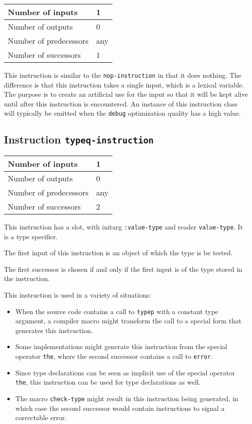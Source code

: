 \begin{tabular}{|l|l|}
\hline
Number of inputs &  1\\
\hline
Number of outputs & 0\\
\hline
Number of predecessors & any\\
\hline
Number of successors & 1\\
\hline
\end{tabular}

This instruction is similar to the \texttt{nop-instruction} in that it
does nothing.  The difference is that this instruction takes a single
input, which is a lexical variable.  The purpose is to create an
artificial use for the input so that it will be kept alive until after
this instruction is encountered.  An instance of this instruction
class will typically be emitted when the \texttt{debug} optimization
quality has a high value.

\subsection{Instruction \texttt{typeq-instruction}}
\label{mir-instruction-typeq}

\begin{tabular}{|l|l|}
\hline
Number of inputs & 1\\
\hline
Number of outputs & 0\\
\hline
Number of predecessors & any\\
\hline
Number of successors & 2\\
\hline
\end{tabular}

This instruction has a slot, with initarg \texttt{:value-type} and
reader \texttt{value-type}. It is a \commonlisp{} type specifier.

The first input of this instruction is an object of which the type
is be tested.

The first successor is chosen if and only if the first input is of
the type stored in the instruction.

This instruction is used in a variety of situations:

\begin{itemize}
\item When the source code contains a call to \texttt{typep} with a
  constant type argument, a compiler macro might transform the call to
  a special form that generates this instruction.
\item Some implementations might generate this instruction from the
  special operator \texttt{the}, where the second successor contains a
  call to \texttt{error}.
\item Since type declarations can be seen as implicit use of the
  special operator \texttt{the}, this instruction can be used for type
  declarations as well.
\item The macro \texttt{check-type} might result in this instruction
  being generated, in which case the second successor would contain
  instructions to signal a correctable error.
\end{itemize}

